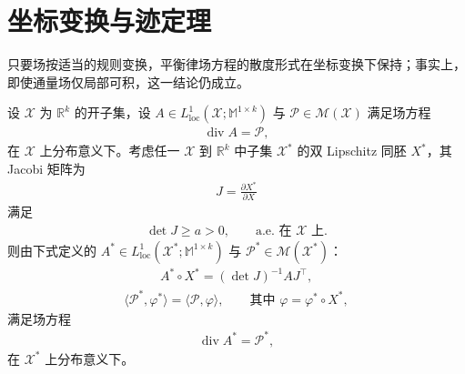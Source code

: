 \documentclass[../../main.tex]{subfiles}
\begin{document}
\section{坐标变换与迹定理}\label{section:ch01-坐标变换与迹定理}

只要场按适当的规则变换，平衡律场方程的散度形式在坐标变换下保持；事实上，即使通量场仅局部可积，这一结论仍成立。

\begin{theorem}\label{theorem:ch01-坐标变换}
设 $\mathscr{X}$ 为 $\mathbb{R}^{k}$ 的开子集，设 $A\in L^{1}_{\mathrm{loc}}(\mathscr{X};\mathbb{M}^{1\times k})$ 与 $\mathscr{P}\in\mathscr{M}(\mathscr{X})$ 满足场方程
\begin{align}
\operatorname{div} A=\mathscr{P},\label{align:ch01-field-eq}
\end{align}
在 $\mathscr{X}$ 上分布意义下。考虑任一 $\mathscr{X}$ 到 $\mathbb{R}^{k}$ 中子集 $\mathscr{X}^{*}$ 的双 Lipschitz 同胚 $X^{*}$，其 Jacobi 矩阵为
\begin{align}
J=\frac{\partial X^{*}}{\partial X}\label{align:ch01-jacobian}
\end{align}
满足
\begin{align}
\det J\geqslant a>0,\qquad\text{a.e. 在 }\mathscr{X}\text{ 上}.\label{align:ch01-detJ}
\end{align}
则由下式定义的 $A^{*}\in L^{1}_{\mathrm{loc}}(\mathscr{X}^{*};\mathbb{M}^{1\times k})$ 与 $\mathscr{P}^{*}\in\mathscr{M}(\mathscr{X}^{*})$：
\begin{align}
A^{*}\circ X^{*}=(\det J)^{-1}AJ^{\top},\label{align:ch01-A-star}
\end{align}
\begin{align}
\langle\mathscr{P}^{*},\varphi^{*}\rangle=\langle\mathscr{P},\varphi\rangle,\qquad\text{其中 }\varphi=\varphi^{*}\circ X^{*},\label{align:ch01-P-star}
\end{align}
满足场方程
\begin{align}
\operatorname{div} A^{*}=\mathscr{P}^{*},\label{align:ch01-divA-star}
\end{align}
在 $\mathscr{X}^{*}$ 上分布意义下。
\end{theorem}
\end{document}
